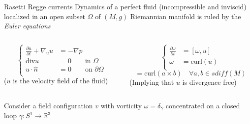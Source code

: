 \documentclass[handout,10pt]{beamer}
\begin{document}
  \begin{frame}{Rasetti Regge currents} \label{frame:RRcurrents}
  		Dynamics of a perfect fluid (incompressible and inviscid) localized in an open subset $\Omega$ 
  		of $(M,g)$ Riemannian manifold is ruled by the \emph{Euler equations}
  		\begin{columns}
				\begin{column}[T]{0.5\textwidth}
  					\begin{displaymath}\tag{EE}
							\begin{cases}
								\frac{\partial u}{\partial t} + \nabla_u u & = -\nabla p  \\
								\textrm{div} u &= 0 \qquad \textrm{in } \Omega \\
								u \cdot \hat{n} &= 0 \qquad \textrm{on } \partial \Omega \\
							\end{cases}
			  		\end{displaymath}
		  		($u$ is the velocity field of the fluid)
				\end{column}
				\vline
				\begin{column}[T]{0.5\textwidth}
  					\begin{displaymath}\tag{EE vorticity form}
							\begin{cases}
			  				\frac{\partial \omega}{\partial t} &= [\omega, u] \\
								\omega &= \textrm{curl}\left( u \right)  \\
							\end{cases}
			  		\end{displaymath}
				\begin{displaymath}
					[a,b] = \textrm{curl}\left( a \times b \right) \quad \forall a,b \in sdiff(M)		
				\end{displaymath}	
					(Implying that $u$ is divergence free)\\	
				\end{column}
			\end{columns}
			\begin{asideblock}
			\begin{columns}
				\begin{column}{0.85\textwidth}
					Consider a field configuration $v$ with vorticity $\omega= \delta_\gamma$ 
					concentrated on a closed loop $\gamma: S^1 \to \mathbb{R}^3$\\

\end{column}
\end{columns}
\end{asideblock}
\end{frame}
\end{document}
